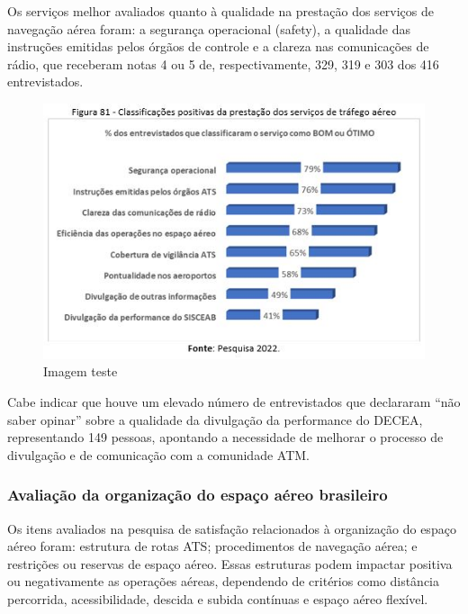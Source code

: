 \documentclass[
]{book}
\begin{document}
Os serviços melhor avaliados quanto à qualidade na prestação dos serviços de navegação aérea foram: a segurança operacional (safety), a qualidade das instruções emitidas pelos órgãos de controle e a clareza nas comunicações de rádio, que receberam notas 4 ou 5 de, respectivamente, 329, 319 e 303 dos 416 entrevistados.

\begin{figure}
\centering
\includegraphics{imagens/fig68.jpg}
\caption{Imagem teste}
\end{figure}

Cabe indicar que houve um elevado número de entrevistados que declararam ``não saber opinar'' sobre a qualidade da divulgação da performance do DECEA, representando 149 pessoas, apontando a necessidade de melhorar o processo de divulgação e de comunicação com a comunidade ATM.

\hypertarget{avaliauxe7uxe3o-da-organizauxe7uxe3o-do-espauxe7o-auxe9reo-brasileiro}{%
\subsubsection{Avaliação da organização do espaço aéreo brasileiro}\label{avaliauxe7uxe3o-da-organizauxe7uxe3o-do-espauxe7o-auxe9reo-brasileiro}}

Os itens avaliados na pesquisa de satisfação relacionados à organização do espaço aéreo foram: estrutura de rotas ATS; procedimentos de navegação aérea; e restrições ou reservas de espaço aéreo. Essas estruturas podem impactar positiva ou negativamente as operações aéreas, dependendo de critérios como distância percorrida, acessibilidade, descida e subida contínuas e espaço aéreo flexível.
\end{document}
